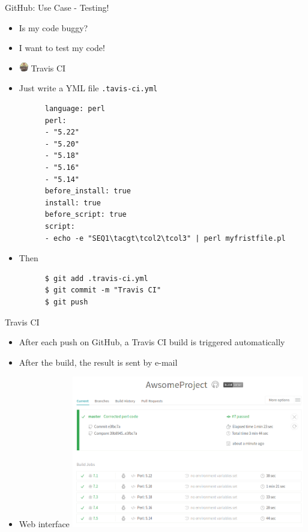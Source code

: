 \begin{frame}[fragile]{GitHub: Use Case - Testing!}
  \begin{itemize}
  \item<1-> Is my code buggy?
  \item<2-> I want to test my code!
  \item<3-> \includegraphics[width=15px]{images/Travis_CI_Logo.png} Travis CI
  \item<4-> Just write a YML file \verb+.tavis-ci.yml+
    \begin{lstlisting}
      language: perl
      perl:
      - "5.22"
      - "5.20"
      - "5.18"
      - "5.16"
      - "5.14"
      before_install: true
      install: true
      before_script: true
      script:
      - echo -e "SEQ1\tacgt\tcol2\tcol3" | perl myfristfile.pl
    \end{lstlisting}
  \item<5-> Then
    \begin{lstlisting}
      $ git add .travis-ci.yml
      $ git commit -m "Travis CI"
      $ git push
    \end{lstlisting}
  \end{itemize}
\end{frame}



\begin{frame}[fragile]{Travis CI}
  \begin{itemize}
  \item After each push on GitHub, a Travis CI build is triggered automatically
  \item After the build, the result is sent by e-mail
  \item Web interface
    \includegraphics[width=0.8\textwidth]{images/hosting_services_use_case_10.png}
  \end{itemize}
\end{frame}

